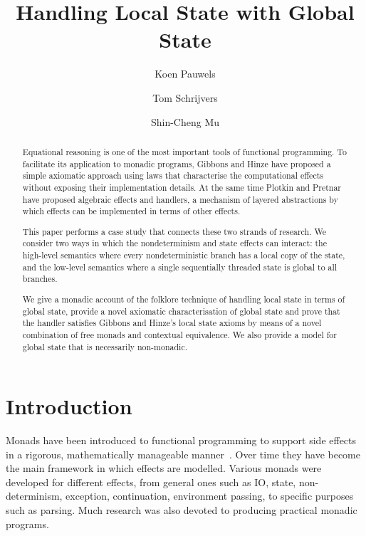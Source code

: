 \documentclass{llncs}
\begin{document}
\title{Handling Local State with Global State}

\author{Koen Pauwels  \and Tom Schrijvers  \and Shin-Cheng Mu }

\maketitle

\begin{abstract}
Equational reasoning is one of the most important tools of functional
programming.
To facilitate its application to monadic programs, Gibbons and Hinze have
proposed a simple axiomatic approach using laws that characterise the
computational effects without exposing their implementation details.  At the
same time Plotkin and Pretnar have proposed algebraic effects and handlers, a
mechanism of layered abstractions by which effects can be implemented in terms of
other effects.

This paper performs a case study that connects these two strands of research.
We consider two ways in which the nondeterminism and state effects can
interact: the high-level semantics where every nondeterministic branch has a
local copy of the state, and the low-level semantics where a single sequentially threaded  state is
global to all branches.

We give a monadic account of the folklore technique of handling local state in
terms of global state, provide a novel axiomatic characterisation of global
state and prove that the handler satisfies Gibbons and Hinze's local state
axioms by means of a novel combination of free monads and contextual
equivalence. We also provide a model for global state that is necessarily
non-monadic.
\end{abstract}





\section{Introduction}
Monads have been introduced to functional programming to support side effects
in a rigorous, mathematically manageable
manner~\cite{Moggi:89:Computational,Wadler:92:Monads}. Over time they have
become the main framework in which effects are modelled. Various monads were
developed for different effects, from general ones such as IO, state,
non-determinism, exception, continuation, environment passing, to specific
purposes such as parsing. Much research was also devoted to producing practical
monadic programs.
\end{document}
